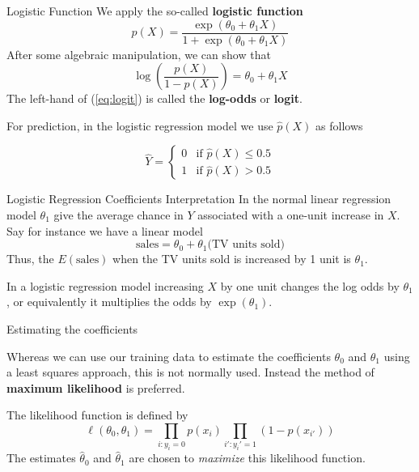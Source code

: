 \documentclass{beamer}
\begin{document}
\begin{frame}{Logistic Function}
	We apply the so-called {\bf logistic function}
	\begin{equation*}
		p(X)= \frac{\exp(\theta_0+ \theta_1 X)}{1+ \exp(\theta_0+\theta_1 X)} 
	\end{equation*}
	After some algebraic manipulation, we can show that
	\begin{equation}
		\log \left( \frac{p(X)}{1-p(X)} \right) = \theta_0 + \theta_1 X
\label{eq:logit}	
\end{equation}
The left-hand of (\ref{eq:logit}) is called the {\bf log-odds} or {\bf logit}.

For prediction, in the logistic regression model we use $\hat{p}(X)$ as follows 

\begin{equation*}
	\hat{Y}=
	\begin{cases}
		0 & \textrm{if } \hat{p}(X)  \le 0.5 \\
		1 &  \textrm{if } \hat{p}(X) > 0.5
	\end{cases}
\end{equation*}
\end{frame}

\begin{frame}{Logistic Regression Coefficients Interpretation}
	In the normal linear regression model $\theta_1$ give the average chance in $Y$ associated with a one-unit increase in $X$.  Say for instance we have a linear model
	\begin{equation*}
		{\textrm{sales}} = {\theta}_0+ {\theta}_1 \textrm{(TV units sold)}
	\end{equation*}
	Thus, the $E(\textrm{sales})$ when the TV units sold is increased by 1 unit is ${\theta}_1$.
	
	In a logistic regression model increasing $X$ by one unit changes the log odds by $\theta_1$, or equivalently it multiplies the odds by $\exp(\theta_1)$. 
	
\end{frame}

\begin{frame}{Estimating the coefficients}
	
	Whereas we can use our training data to estimate the coefficients $\theta_0$ and $\theta_1$ using a least squares approach, this is not normally used. Instead the method of {\bf maximum likelihood} is preferred. 
	
	The likelihood function is defined by 
	\begin{equation*}
		\ell (\theta_0,\theta_1)= \prod_{i:y_i=0} p(x_i) \prod_{i':y_i'=1} (1-p(x_{i'}))
	\end{equation*}
The estimates $\hat{\theta}_0$ and $\hat{\theta}_1$  are chosen to {\it maximize} this likelihood function. 
	
\end{frame}
\end{document}

